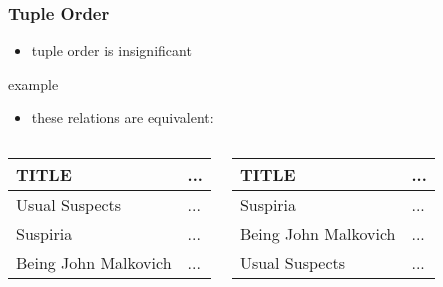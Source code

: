 \documentclass[dvipsnames]{beamer}
\theoremstyle{plain}
\begin{document}
\begin{frame}
  \frametitle{Tuple Order}

  \begin{itemize}
    \item tuple order is insignificant
  \end{itemize}

  \medskip
  \begin{exampleblock}{example}
    \begin{itemize}
      \item these relations are equivalent:
    \end{itemize}

    \begin{columns}
      \begin{footnotesize}
      \begin{table}
        \begin{tabular}{|l|l|}\hline
TITLE                & ...\\\hline\hline
Usual Suspects       & ...\\\hline
Suspiria             & ...\\\hline
Being John Malkovich & ...\\\hline
        \end{tabular}
      \end{table}
      \end{footnotesize}

      \begin{footnotesize}
      \begin{table}
        \begin{tabular}{|l|l|}\hline
TITLE                & ...\\\hline\hline
Suspiria             & ...\\\hline
Being John Malkovich & ...\\\hline
Usual Suspects       & ...\\\hline
        \end{tabular}
      \end{table}
      \end{footnotesize}
    \end{columns}
  \end{exampleblock}
\end{frame}
\end{document}
